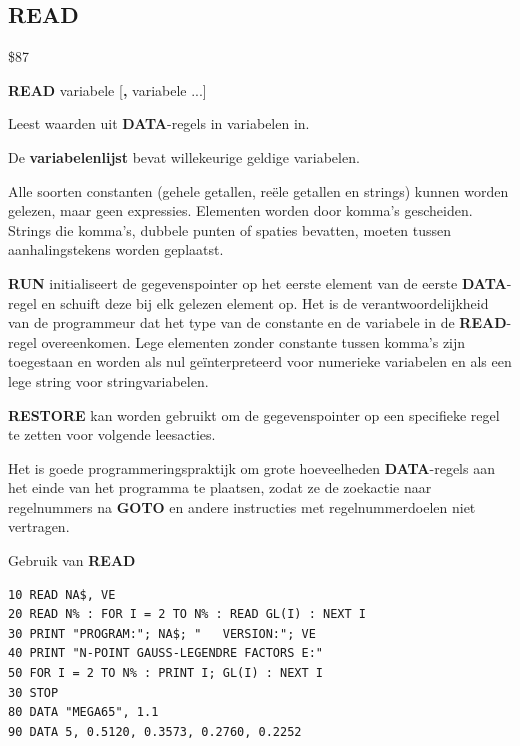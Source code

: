 \subsection{READ}
\begin{description}[leftmargin=2cm,style=nextline]
\item [Token:]    \$87

\item [Formaat:]   {\bf READ} variabele [{\bf,} variabele ...]

\item [Gebruik:]    Leest waarden uit {\bf DATA}-regels in variabelen in.

                  De {\bf variabelenlijst} bevat willekeurige geldige variabelen.

                  Alle soorten constanten (gehele getallen, reële getallen en strings) kunnen worden gelezen, maar geen expressies. Elementen worden door komma's gescheiden. Strings die komma's, dubbele punten of spaties bevatten, moeten tussen aanhalingstekens worden geplaatst.

                  {\bf RUN} initialiseert de gegevenspointer op het eerste element van de eerste {\bf DATA}-regel en schuift deze bij elk gelezen element op. Het is de verantwoordelijkheid van de programmeur dat het type van de constante en de variabele in de {\bf READ}-regel overeenkomen. Lege elementen zonder constante tussen komma's zijn toegestaan en worden als nul geïnterpreteerd voor numerieke variabelen en als een lege string voor stringvariabelen.

                  {\bf RESTORE} kan worden gebruikt om de gegevenspointer op een specifieke regel te zetten voor volgende leesacties.

\item [Opmerkingen:]  Het is goede programmeringspraktijk om grote hoeveelheden {\bf DATA}-regels aan het einde van het programma te plaatsen, zodat ze de zoekactie naar regelnummers na {\bf GOTO} en andere instructies met regelnummerdoelen niet vertragen.

\item [Voorbeeld:]  Gebruik van {\bf READ}

\begin{tcolorbox}[colback=black,coltext=white]
\verbatimfont{\codefont}
\begin{verbatim}
10 READ NA$, VE
20 READ N% : FOR I = 2 TO N% : READ GL(I) : NEXT I
30 PRINT "PROGRAM:"; NA$; "   VERSION:"; VE
40 PRINT "N-POINT GAUSS-LEGENDRE FACTORS E:"
50 FOR I = 2 TO N% : PRINT I; GL(I) : NEXT I
30 STOP
80 DATA "MEGA65", 1.1
90 DATA 5, 0.5120, 0.3573, 0.2760, 0.2252
\end{verbatim}
\end{tcolorbox}
\end{description}

